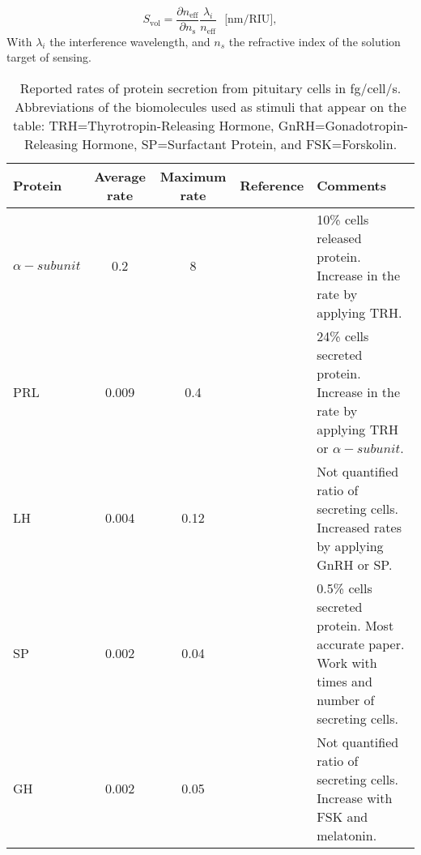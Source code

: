 \documentclass[12pt,a4paper]{report}
\begin{document}
\begin{equation}
   S_\text{vol}=\frac{\partial n_\text{eff}}{\partial n_\text{s}}\frac{\lambda_i}{n_\text{eff}}~~~\text{[nm/RIU]}, %
   \label{eq:vol}
\end{equation}
With $\lambda_i$ the interference wavelength, and $n_s$ the refractive index of the solution target of sensing.\par
\begin{center}
\begin{table}
    \caption{Reported rates of protein secretion from pituitary cells in fg/cell/s. Abbreviations of the biomolecules used as stimuli that appear on the table: TRH=Thyrotropin-Releasing Hormone, GnRH=Gonadotropin-Releasing Hormone, SP=Surfactant Protein, and FSK=Forskolin.}
    \begin{tabular}{ lcccp{4cm}} \toprule %
    Protein & Average rate & Maximum rate & Reference & Comments \\ \midrule
    $\alpha-subunit$ & 0.2 & 8 & \cite{oguchi96:141} & 10\% cells released protein. Increase in the rate by applying TRH.\\ 
    PRL & 0.009 & 0.4 & \cite{oguchi96:141} & 24\% cells secreted protein. Increase in the rate by applying TRH or $\alpha-subunit$. \\ 
    LH & 0.004 & 0.12 & \cite{hidalgodiaz98:678} & Not quantified ratio of secreting cells. Increased rates by applying GnRH or SP. \\ 
    SP & 0.002 & 0.04 & \cite{arita93:2682} & 0.5\% cells secreted protein. Most accurate paper. Work with times and number of secreting cells. \\ 
    GH & 0.002 & 0.05 & \cite{falcon03:4648} & Not quantified ratio of secreting cells. Increase with FSK and melatonin. \\ \bottomrule
    \end{tabular}
    \label{tab:ratestable}
\end{table}
\end{center}
\end{document}
